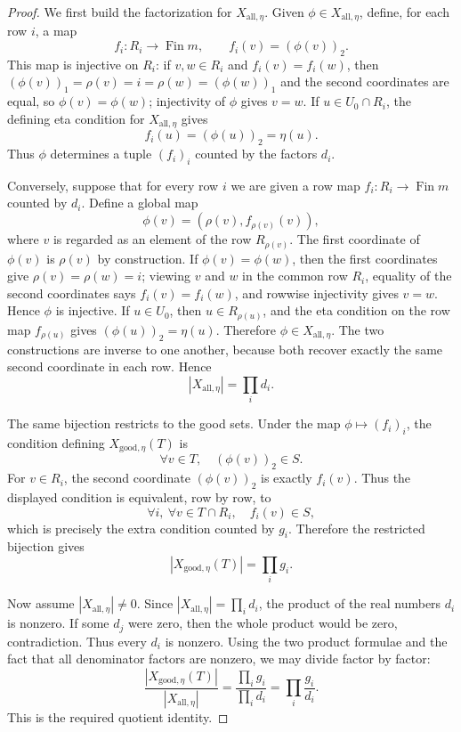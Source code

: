 \begin{proof}
We first build the factorization for \(X_{\mathrm{all},\eta}\).  Given
\(\phi\in X_{\mathrm{all},\eta}\), define, for each row \(i\), a map
\[
f_i:R_i\to \operatorname{Fin}m,\qquad f_i(v)=(\phi(v))_2 .
\]
This map is injective on \(R_i\): if \(v,w\in R_i\) and
\(f_i(v)=f_i(w)\), then \((\phi(v))_1=\rho(v)=i=\rho(w)=(\phi(w))_1\)
and the second coordinates are equal, so \(\phi(v)=\phi(w)\); injectivity
of \(\phi\) gives \(v=w\).  If \(u\in U_0\cap R_i\), the defining eta
condition for \(X_{\mathrm{all},\eta}\) gives
\[
f_i(u)=(\phi(u))_2=\eta(u).
\]
Thus \(\phi\) determines a tuple \((f_i)_i\) counted by the factors \(d_i\).

Conversely, suppose that for every row \(i\) we are given a row map
\(f_i:R_i\to\operatorname{Fin}m\) counted by \(d_i\).  Define a global map
\[
\phi(v)=(\rho(v),f_{\rho(v)}(v)),
\]
where \(v\) is regarded as an element of the row \(R_{\rho(v)}\).  The first
coordinate of \(\phi(v)\) is \(\rho(v)\) by construction.  If
\(\phi(v)=\phi(w)\), then the first coordinates give \(\rho(v)=\rho(w)=i\);
viewing \(v\) and \(w\) in the common row \(R_i\), equality of the second
coordinates says \(f_i(v)=f_i(w)\), and rowwise injectivity gives
\(v=w\).  Hence \(\phi\) is injective.  If \(u\in U_0\), then \(u\in
R_{\rho(u)}\), and the eta condition on the row map \(f_{\rho(u)}\) gives
\((\phi(u))_2=\eta(u)\).  Therefore \(\phi\in X_{\mathrm{all},\eta}\).
The two constructions are inverse to one another, because both recover
exactly the same second coordinate in each row.  Hence
\[
|X_{\mathrm{all},\eta}|=\prod_i d_i .
\]

The same bijection restricts to the good sets.  Under the map
\(\phi\mapsto (f_i)_i\), the condition defining
\(X_{\mathrm{good},\eta}(T)\) is
\[
\forall v\in T,\quad (\phi(v))_2\in S.
\]
For \(v\in R_i\), the second coordinate \((\phi(v))_2\) is exactly
\(f_i(v)\).  Thus the displayed condition is equivalent, row by row, to
\[
\forall i,\ \forall v\in T\cap R_i,\quad f_i(v)\in S,
\]
which is precisely the extra condition counted by \(g_i\).  Therefore the
restricted bijection gives
\[
|X_{\mathrm{good},\eta}(T)|=\prod_i g_i .
\]

Now assume \(|X_{\mathrm{all},\eta}|\ne0\).  Since
\(|X_{\mathrm{all},\eta}|=\prod_i d_i\), the product of the real numbers
\(d_i\) is nonzero.  If some \(d_j\) were zero, then the whole product would
be zero, contradiction.  Thus every \(d_i\) is nonzero.  Using the two
product formulae and the fact that all denominator factors are nonzero, we
may divide factor by factor:
\[
\frac{|X_{\mathrm{good},\eta}(T)|}{|X_{\mathrm{all},\eta}|}
=\frac{\prod_i g_i}{\prod_i d_i}
=\prod_i\frac{g_i}{d_i}.
\]
This is the required quotient identity.
\end{proof}
